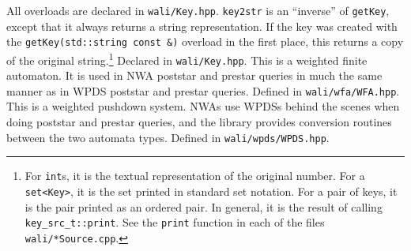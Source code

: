 \begin{functionlist}
    All overloads are declared in \texttt{wali/Key.hpp}.
   \texttt{key2str} is an ``inverse'' of \texttt{getKey}, except that it
    always returns a string representation. If the key was created with the
    \texttt{getKey(std::string const \&)} overload in the first place, this
    returns a copy of the original string.\footnote{For \texttt{int}s, it is the
    textual representation of the original number. For a \texttt{set<Key>},
    it is the set printed in standard set notation. For a pair of keys, it is
    the pair printed as an ordered pair. In general, it is the result of
    calling \texttt{key\_src\_t::print}. See the \texttt{print} function in
    each of the files \texttt{wali/*Source.cpp}.} Declared in
    \texttt{wali/Key.hpp}.
   This is a weighted finite automaton. It is
    used in NWA poststar and prestar queries in much the same manner as in
    WPDS poststar and prestar queries. Defined in \texttt{wali/wfa/WFA.hpp}.
   This is a weighted pushdown system. NWAs use
    WPDSs behind the scenes when doing poststar and prestar queries, and the
    library provides conversion routines between the two automata
    types. Defined in \texttt{wali/wpds/WPDS.hpp}.
\end{functionlist}


